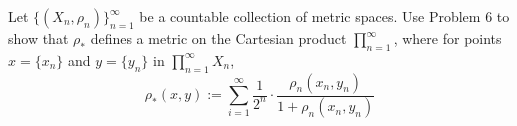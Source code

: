 \begin{problem}
	Let \( \{ (X_n, \rho_n) \}_{n=1}^\infty \) be a countable collection of metric spaces. Use Problem 6 to show that \( \rho_* \) defines a metric on the Cartesian product \( \prod_{n=1}^\infty \), where for points \( x=\{x_n \} \) and \( y= \{ y_n \} \) in \( \prod_{n=1}^\infty X_n \), 
	\[
		\rho_* (x,y) := \sum_{i=1}^\infty \frac{1}{2^n} \cdot \frac{\rho_n(x_n, y_n)}{1+\rho_n(x_n, y_n)}
	\]
\end{problem}